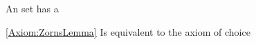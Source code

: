 \begin{thm}
\label{Axiom:ZornsLemma}
\rm
An \InductivelyOrdered set has a \Maximum
\end{thm}
\begin{rmk}
\rm
\ref{Axiom:ZornsLemma} Is equivalent to the axiom of choice
\end{rmk}
